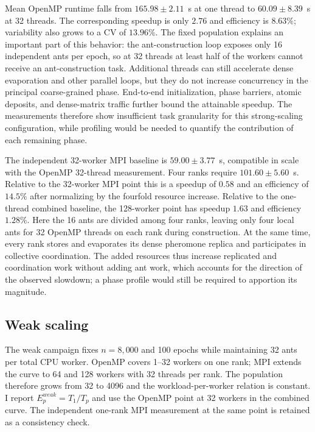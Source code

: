 Mean OpenMP runtime falls from $165.98\pm2.11$~s at one thread to $60.09\pm8.39$~s at 32 threads.  The corresponding speedup is only $2.76$ and efficiency is $8.63\%$; variability also grows to a CV of $13.96\%$.  The fixed population explains an important part of this behavior: the ant-construction loop exposes only 16 independent ants per epoch, so at 32 threads at least half of the workers cannot receive an ant-construction task.  Additional threads can still accelerate dense evaporation and other parallel loops, but they do not increase concurrency in the principal coarse-grained phase.  End-to-end initialization, phase barriers, atomic deposits, and dense-matrix traffic further bound the attainable speedup.  The measurements therefore show insufficient task granularity for this strong-scaling configuration, while profiling would be needed to quantify the contribution of each remaining phase.

The independent 32-worker MPI baseline is $59.00\pm3.77$~s, compatible in scale with the OpenMP 32-thread measurement.  Four ranks require $101.60\pm5.60$~s.  Relative to the 32-worker MPI point this is a speedup of $0.58$ and an efficiency of $14.5\%$ after normalizing by the fourfold resource increase.  Relative to the one-thread combined baseline, the 128-worker point has speedup $1.63$ and efficiency $1.28\%$.  Here the 16 ants are divided among four ranks, leaving only four local ants for 32 OpenMP threads on each rank during construction.  At the same time, every rank stores and evaporates its dense pheromone replica and participates in collective coordination.  The added resources thus increase replicated and coordination work without adding ant work, which accounts for the direction of the observed slowdown; a phase profile would still be required to apportion its magnitude.

\subsection{Weak scaling}

The weak campaign fixes $n=8{,}000$ and 100 epochs while maintaining 32 ants per total CPU worker.  OpenMP covers 1--32 workers on one rank; MPI extends the curve to 64 and 128 workers with 32 threads per rank.  The population therefore grows from 32 to 4096 and the workload-per-worker relation is constant.  I report $E^{weak}_p=T_1/T_p$ and use the OpenMP point at 32 workers in the combined curve.  The independent one-rank MPI measurement at the same point is retained as a consistency check.

